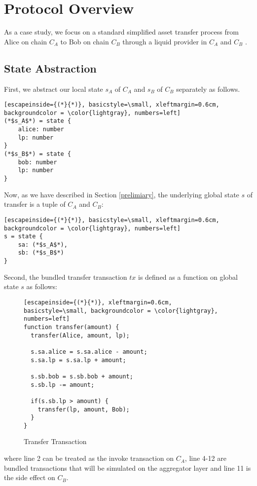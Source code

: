 \section{Protocol Overview}
\label{chp:case-study}
As a case study, we focus on a standard simplified asset transfer process from Alice on chain $C_A$ to Bob on chain $C_B$ through a liquid provider in $C_A$ and $C_B$ \cite{introdefi}. 



\subsection{State Abstraction}
First, 
we abstract our local state $s_A$ of $C_A$ and $s_B$ of $C_B$ separately as follows.

\begin{lstlisting}[escapeinside={(*}{*)}, basicstyle=\small, xleftmargin=0.6cm, backgroundcolor = \color{lightgray}, numbers=left]
(*$s_A$*) = state {
    alice: number
    lp: number
}
(*$s_B$*) = state {
    bob: number
    lp: number
}
\end{lstlisting}

Now, as we have described in Section \ref{prelimiary}, the underlying global state $s$ of transfer is a tuple of $C_A$ and $C_B$:
\begin{lstlisting}[escapeinside={(*}{*)}, basicstyle=\small, xleftmargin=0.6cm, backgroundcolor = \color{lightgray}, numbers=left]
s = state {
    sa: (*$s_A$*),
    sb: (*$s_B$*)
}
\end{lstlisting}
Second, the bundled transfer transaction $tx$ is defined as a function on global state $s$ as follows:
\begin{figure}[!ht]

\begin{lstlisting}[escapeinside={(*}{*)}, xleftmargin=0.6cm, basicstyle=\small, backgroundcolor = \color{lightgray}, numbers=left]
function transfer(amount) {
  transfer(Alice, amount, lp);
  
  s.sa.alice = s.sa.alice - amount;
  s.sa.lp = s.sa.lp + amount;
  
  s.sb.bob = s.sb.bob + amount;
  s.sb.lp -= amount;
  
  if(s.sb.lp > amount) {
    transfer(lp, amount, Bob);
  }
}
\end{lstlisting}
\caption{Transfer Transaction}
\label{fg:transfer}
\end{figure}
where line 2 can be treated as the invoke transaction on $C_A$, line 4-12 are bundled transactions that will be simulated on the aggregator layer and line 11 is the side effect on $C_B$.

